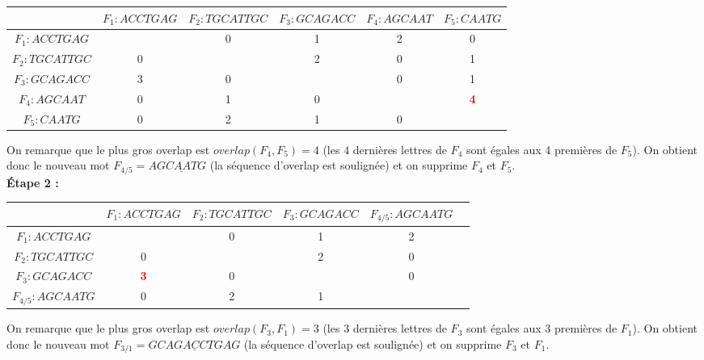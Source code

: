 \documentclass[11pt,letterpaper]{article}
\begin{document}
\begin{center}
\begin{tabular}{|*{6}{c|}}
    \hline
    & $F_1 : ACCTGAG$ & $F_2 : TGCATTGC$ & $F_3 : GCAGACC$ & $F_4 : AGCAAT$ & $F_5 : CAATG$\\
    \hline
    $F_1 : ACCTGAG$ & & 0 & 1 & 2 & 0\\
    \hline
    $F_2 : TGCATTGC$  & 0 & & 2 & 0 & 1 \\
    \hline
    $F_3 : GCAGACC$  & 3 & 0 & & 0 & 1\\
    \hline
    $F_4 : AGCAAT$  & 0 & 1 & 0 & & \textbf{\textcolor{red}{4}} \\
    \hline
    $F_5 : CAATG$  & 0 & 2 & 1 & 0 & \\
    \hline
\end{tabular}
\end{center}

\vspace{3px}

On remarque que le plus gros overlap est $overlap(F_4,F_5) = 4$ (les 4 dernières lettres de $F_4$ sont égales aux 4 premières de $F_5$). On obtient donc le nouveau mot $F_{4/5} = AG\underline{CAAT}G$ (la séquence d'overlap est soulignée) et on supprime $F_4$ et $F_5$.\\

\textbf{Étape 2 :}\\

\begin{center}
\begin{tabular}{|*{6}{c|}}
    \hline
    & $F_1 : ACCTGAG$ & $F_2 : TGCATTGC$ & $F_3 : GCAGACC$ & $F_{4/5}  : AGCAATG$ \\
    \hline
    $F_1 : ACCTGAG$ & & 0 & 1 & 2 \\
    \hline
    $F_2 : TGCATTGC$  & 0 & & 2 & 0 \\
    \hline
    $F_3 : GCAGACC$  & \textbf{\textcolor{red}{3}} & 0 & & 0 \\
    \hline
    $F_{4/5} : AGCAATG$ & 0 & 2 & 1 &  \\
    \hline
\end{tabular}
\end{center}

\vspace{5px}

On remarque que le plus gros overlap est $overlap(F_3,F_1) = 3$ (les 3 dernières lettres de $F_3$ sont égales aux 3 premières de $F_1$). On obtient donc le nouveau mot $F_{3/1} = GCAG\underline{ACC}TGAG$ (la séquence d'overlap est soulignée) et on supprime $F_3$ et $F_1$.\\
\end{document}
